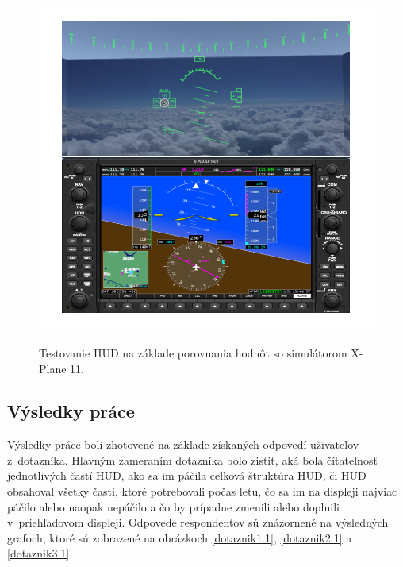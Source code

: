 \newpage
\begin{figure}[ht]
\centering
\includegraphics[scale=0.69]{obrazky-figures/porovnanie.png}
\caption{Testovanie HUD na základe porovnania hodnôt so simulátorom X-Plane 11.}{\label{porovnanie}}
\end{figure}

\subsection{Výsledky práce}
Výsledky práce boli zhotovené na základe získaných odpovedí uživateľov z~dotazníka. Hlavným zameraním dotazníka bolo zistiť, aká bola čítateľnosť jednotlivých častí HUD, ako sa im páčila celková štruktúra HUD, či HUD obsahoval všetky časti, ktoré potrebovali počas letu, čo sa im na displeji najviac páčilo alebo naopak nepáčilo a čo by prípadne zmenili alebo doplnili v~priehľadovom displeji. Odpovede respondentov sú znázornené na výsledných grafoch, ktoré sú zobrazené na obrázkoch \ref{dotaznik1.1}, \ref{dotaznik2.1} a \ref{dotaznik3.1}.


